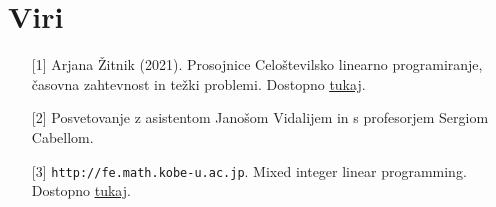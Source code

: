 \documentclass[11pt]{article}
\theoremstyle{definition}
\newcommand{\1}{\mathbbm{1}}
\begin{document}
\pagebreak


\vspace{0.5cm}

\section*{Viri}
\vspace{0.5cm}
\begin{itemize}
	\item[{[1]}] Arjana Žitnik (2021). Prosojnice Celoštevilsko linearno programiranje, časovna zahtevnost in težki problemi.
		Dostopno \href{https://ucilnica2021.fmf.uni-lj.si/pluginfile.php/58787/mod_resource/content/13/CLP.pdf}{\color{blue}\underline{tukaj}\color{black}}.
	\item[{[2]}] Posvetovanje z asistentom Janošom Vidalijem in s profesorjem Sergiom Cabellom.
	\item[{[3]}] \texttt{http://fe.math.kobe-u.ac.jp}. Mixed integer linear programming. Dostopno \href{http://fe.math.kobe-u.ac.jp/icms2010-dvd/SAGE/www.sagemath.org/doc/reference/sage/numerical/mip.html}{\color{blue}\underline{tukaj}\color{black}}.
\end{itemize}
\end{document}
